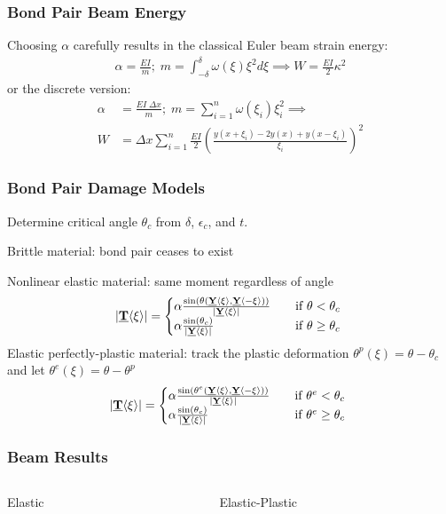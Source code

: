 \documentclass{beamer}
\newcommand{\plotpath}{./plots}
\newcommand\vstate[3]{%
	\mathbf{\underline{#1}}%
	\ifstrempty{#2}{}{[#2]}%
	\ifstrempty{#3}{}{\langle #3 \rangle}%
	}
\begin{document}
%
%
\begin{frame}
  \frametitle{Bond Pair Beam Energy}
%
Choosing \(\alpha\) carefully results in the classical Euler beam strain energy:
%
\begin{align*}
\alpha = \frac{EI}{m} ;\; m=\int_{-\delta}^\delta \omega(\xi)\xi^2 d\xi \implies W=\frac{EI}{2}\kappa^2
\end{align*}
%
or the discrete version: 
%
\begin{align*}
\label{eq:discretebeam}
\alpha &= \frac{EI\; \Delta x}{m} ;\; m=\sum_{i=1}^n \omega(\xi_i)\xi_i^2 \implies \nonumber \\
W&=\Delta x \sum_{i=1}^n \frac{EI}{2}\left(\frac{y(x+\xi_i)-2y(x)+y(x-\xi_i)}{\xi_i}\right)^2
\end{align*}
%
\end{frame}
%
%
\begin{frame}
  \frametitle{Bond Pair Damage Models}
  Determine critical angle $\theta_c$ from $\delta$, $\epsilon_c$, and $t$.
  
  Brittle material: bond pair ceases to exist
  
  Nonlinear elastic material: same moment regardless of angle
  \[ 
|\vstate{T}{}{\xi}| = 
  \begin{cases}
    \alpha \frac{\sin(\theta(\vstate{Y}{}{\xi},\vstate{Y}{}{\mathbf{-\xi}}))}{|\vstate{Y}{}{\xi}|} & \quad \text{if } \theta < \theta_c\\
    \alpha \frac{\sin(\theta_c)}{|\vstate{Y}{}{\xi}|} & \quad \text{if } \theta \geq \theta_c\
  \end{cases}
\]
 Elastic perfectly-plastic material: track the plastic deformation \(\theta^p (\xi) = \theta-\theta_c\) and let \(\theta^e (\xi) = \theta-\theta^p\)
 \[ 
|\vstate{T}{}{\xi}| = 
  \begin{cases}
    \alpha \frac{\sin(\theta^e(\vstate{Y}{}{\xi},\vstate{Y}{}{\mathbf{-\xi}}))}{|\vstate{Y}{}{\xi}|} & \quad \text{if } \theta^e < \theta_c\\
    \alpha \frac{\sin(\theta_c)}{|\vstate{Y}{}{\xi}|} & \quad \text{if } \theta^e \geq \theta_c\
  \end{cases}
\]
%
\end{frame}
%
\begin{frame}
  \frametitle{Beam Results}
     \begin{columns}[T] %
     \begin{column}[T]{5cm} %
 	 \centering
	Elastic
	 \resizebox{\linewidth}{!}{}
     \end{column}
     \begin{column}[T]{5cm} %
	\centering
	Elastic-Plastic
	\resizebox{\linewidth}{!}{}
     \end{column}
     \end{columns}
\end{frame}
\end{document}

